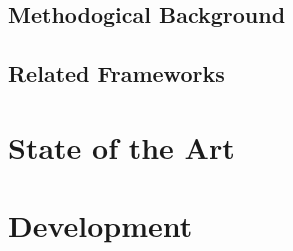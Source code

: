 \section{Methodogical Background}


\section{Related Frameworks}




\chapter{State of the Art}
\label{ch:stateoftheart}
\lipsum[1-2]


\chapter{Development}
\label{ch:Development}
\lipsum[1-2]
 


